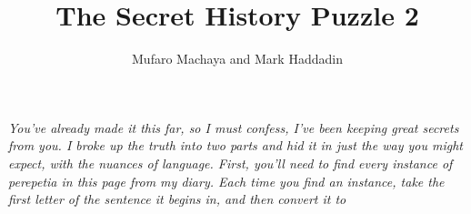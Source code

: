 \documentclass[12pt]{article}
\title{The Secret History Puzzle 2}
\author{Mufaro Machaya and Mark Haddadin}
\begin{document}
\maketitle

\textit{You've already made it this far, so I must confess, I've been keeping great secrets from you. I broke up the truth into two parts and hid it in just the way you might expect, with the nuances of language. First, you'll need to find every instance of perepetia in this page from my diary. Each time you find an instance, take the first letter of the sentence it begins in, and then convert it to }
\end{document}

